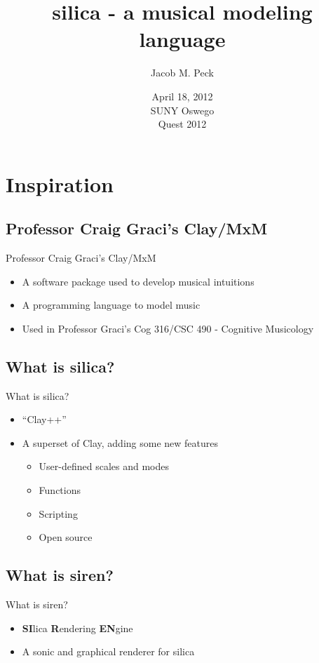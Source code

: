 \documentclass[12pt]{beamer}
\begin{document}
\title{silica - a musical modeling language}
\author{Jacob M. Peck}
\date{April 18, 2012\\SUNY Oswego\\Quest 2012}
\maketitle

\section{Inspiration}
\subsection{Professor Craig Graci's Clay/MxM}
\begin{frame}{Professor Craig Graci's Clay/MxM}
  \begin{itemize}
    \item A software package used to develop musical intuitions
    \item A programming language to model music
    \item Used in Professor Graci's Cog 316/CSC 490 - Cognitive Musicology
  \end{itemize}
\end{frame}

\subsection{What is silica?}
\begin{frame}{What is silica?}
  \begin{itemize}
    \item ``Clay++''
    \item A superset of Clay, adding some new features
    \begin{itemize}
      \item User-defined scales and modes
      \item Functions
      \item Scripting
      \item Open source
    \end{itemize}
  \end{itemize}
\end{frame}

\subsection{What is siren?}
\begin{frame}{What is siren?}
  \begin{itemize}
    \item \textbf{SI}lica \textbf{R}endering \textbf{EN}gine
    \item A sonic and graphical renderer for silica
  \end{itemize}
\end{frame}
\end{document}
